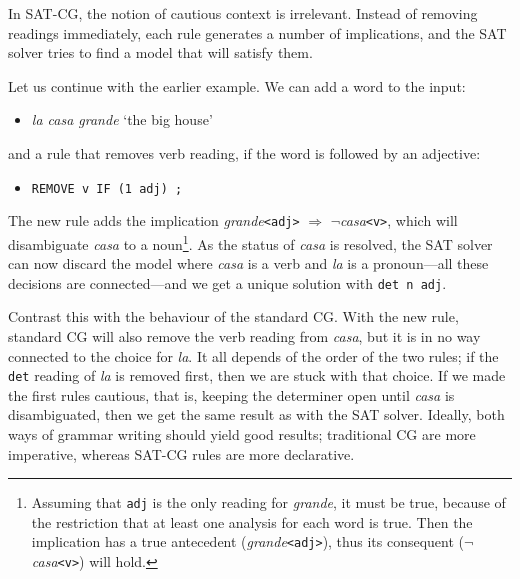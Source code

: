 \documentclass[11pt]{article}
\begin{document}
In SAT-CG, the notion of cautious context is irrelevant. Instead of
removing readings immediately,  each rule generates a  number of
implications, and the SAT solver tries to find a model that will satisfy them. 


Let us continue with the earlier example. 
We can add a word to the input:
\begin{itemize}
\item [] \emph{la casa grande} `the big house'
\end{itemize}
and a rule that removes verb reading, if the word is followed by an adjective:
\begin{itemize}
\item [] \texttt{REMOVE v IF (1 adj) ;}
\end{itemize}

The new rule adds the implication
 \emph{grande}\texttt{<adj>} $\Rightarrow$
 $\neg$\emph{casa}\texttt{<v>}, which will
disambiguate  \emph{casa} to a noun\footnote{Assuming that
  \texttt{adj} is the only reading for \emph{grande}, it must be true,
  because of the restriction that at least one analysis for each word
  is true. Then the implication has a true antecedent (\emph{grande}\texttt{<adj>}), thus its
  consequent ($\neg$\emph{casa}\texttt{<v>}) will hold.}. 
As the status of \emph{casa} is resolved, the SAT solver can now
discard the model where \emph{casa} is a verb and \emph{la} is a
pronoun---all these decisions are connected---and we get a unique solution with \texttt{det n adj}.

Contrast this with the behaviour of the standard CG.
With the new rule, standard CG will also remove the verb reading from \emph{casa}, 
but it is in no way connected to the choice for \emph{la}. It all
depends of the order of the two rules; if the \texttt{det} reading of
\emph{la} is removed first, then we are stuck with that choice.
If we made the first rules cautious, that is, keeping the determiner
open until \emph{casa} is disambiguated, then we get the same
result as with the SAT solver.
Ideally, both ways of grammar writing should yield good results;
traditional CG are more imperative, whereas SAT-CG
rules are more declarative.
\end{document}
